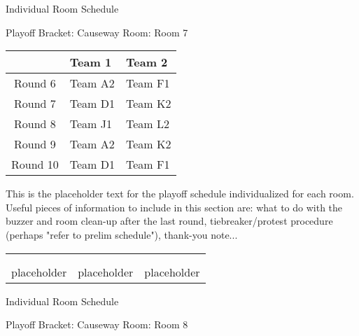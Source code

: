 \documentclass{article}%
\begin{document}
\newpage%
\begin{center}%
\begin{Huge}%
Individual Room Schedule%
\end{Huge}%
\vspace*{16pt}%
\linebreak%
\begin{Large}%
Playoff Bracket: Causeway \hfill Room: Room 7%
\end{Large}%
\end{center}%
%
\begin{tabularx}{\textwidth}{|c|Y|Y|}%
\hline%
&Team 1&Team 2\\%
\hline%
Round 6&Team A2&Team F1\\%
Round 7&Team D1&Team K2\\%
Round 8&Team J1&Team L2\\%
Round 9&Team A2&Team K2\\%
Round 10&Team D1&Team F1\\%
\hline%
\end{tabularx}%
\vspace*{16pt}%
\linebreak%
This is the placeholder text for the playoff schedule individualized for each room. Useful pieces of information to include in this section are: what to do with the buzzer and room clean{-}up after the last round, tiebreaker/protest procedure (perhaps "refer to prelim schedule"), thank{-}you note...%
\vspace*{30pt}%
\newline%
%
\begin{tabularx}{\textwidth}{YYY}%
  &  &  \\%
\\%
placeholder&placeholder&placeholder\\%
\end{tabularx}%
\newpage%
\begin{center}%
\begin{Huge}%
Individual Room Schedule%
\end{Huge}%
\vspace*{16pt}%
\linebreak%
\begin{Large}%
Playoff Bracket: Causeway \hfill Room: Room 8%
\end{Large}%
\end{center}%
\end{document}
